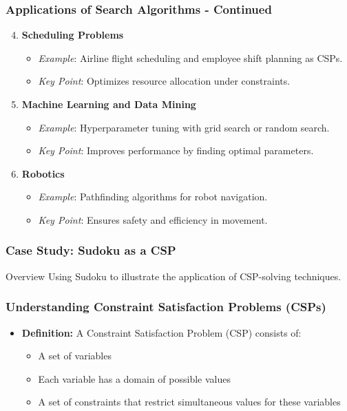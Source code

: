\documentclass[aspectratio=169]{beamer}
\begin{document}
\begin{frame}[fragile]
    \frametitle{Applications of Search Algorithms - Continued}
    \begin{enumerate}
        \setcounter{enumi}{3} %
        \item \textbf{Scheduling Problems}
            \begin{itemize}
                \item \textit{Example}: Airline flight scheduling and employee shift planning as CSPs.
                \item \textit{Key Point}: Optimizes resource allocation under constraints.
            \end{itemize}

        \item \textbf{Machine Learning and Data Mining}
            \begin{itemize}
                \item \textit{Example}: Hyperparameter tuning with grid search or random search.
                \item \textit{Key Point}: Improves performance by finding optimal parameters.
            \end{itemize}

        \item \textbf{Robotics}
            \begin{itemize}
                \item \textit{Example}: Pathfinding algorithms for robot navigation.
                \item \textit{Key Point}: Ensures safety and efficiency in movement.
            \end{itemize}
    \end{enumerate}
\end{frame}

\begin{frame}
    \frametitle{Case Study: Sudoku as a CSP}
    \begin{block}{Overview}
        Using Sudoku to illustrate the application of CSP-solving techniques.
    \end{block}
\end{frame}

\begin{frame}
    \frametitle{Understanding Constraint Satisfaction Problems (CSPs)}
    \begin{itemize}
        \item \textbf{Definition:} A Constraint Satisfaction Problem (CSP) consists of:
        \begin{itemize}
            \item A set of variables
            \item Each variable has a domain of possible values
            \item A set of constraints that restrict simultaneous values for these variables
        \end{itemize}
    \end{itemize}
\end{frame}
\end{document}
